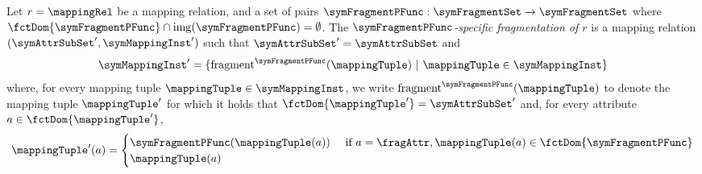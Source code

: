 \begin{definition}
	\label{def:fragmenter_operator}
	Let $r=\mappingRel$ be a mapping relation, and a set of pairs
	$\symFragmentPFunc:  \symFragmentSet \rightarrow \symFragmentSet$
	where $\fctDom{\symFragmentPFunc} \cap \mathrm{img}(\symFragmentPFunc) = \emptyset$.
	The \emph{$\symFragmentPFunc$-specific fragmentation of $r$} is
	a mapping relation $(\symAttrSubSet', \symMappingInst')$ such that
	$\symAttrSubSet' =  \symAttrSubSet$ and
	\begin{equation*}
		\symMappingInst'=
		\{ \mathrm{fragment}^{\symFragmentPFunc}(\mappingTuple) \ | \
		\mappingTuple \in \symMappingInst
		\}
	\end{equation*}
	where, for every mapping tuple $\mappingTuple \in \symMappingInst$,
	we write $\mathrm{fragment}^{\symFragmentPFunc}(\mappingTuple)$
	to denote the mapping tuple $\mappingTuple'$ for which it holds
	that $\fctDom{\mappingTuple'} = \symAttrSubSet'$ and,
	for every attribute $a \in \fctDom{\mappingTuple'}$,
	\begin{equation*}
		\mappingTuple'(a) =
		\begin{cases}
			\symFragmentPFunc(\mappingTuple(a)) & \text{ if } a = \fragAttr,
			\mappingTuple(a) \in \fctDom{\symFragmentPFunc}                  \\
			\mappingTuple(a)
		\end{cases}
	\end{equation*}
\end{definition}


